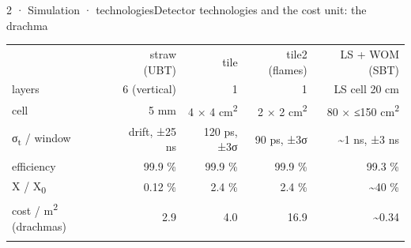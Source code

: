 \begin{btframe}{2 · Simulation · technologies}{Detector technologies and the cost unit: the drachma}
{\fontsize{6.36pt}{8.66pt}\selectfont\setlength{\tabcolsep}{3.05pt}\renewcommand{\arraystretch}{1.42}
\begin{tabularx}{\linewidth}{>{\raggedright\arraybackslash}Xrrrr}
\textcolor{muted}{} & \textcolor{muted}{straw (UBT)} & \textcolor{muted}{tile} & \textcolor{muted}{tile2 (flames)} & \textcolor{muted}{LS + WOM (SBT)} \\\headrule
layers & 6 (vertical) & 1 & 1 & LS cell 20 cm \\\rowrule
cell & 5 mm & 4 × 4 cm\textsuperscript{2} & 2 × 2 cm\textsuperscript{2} & 80 × ≤150 cm\textsuperscript{2} \\\rowrule
σ\textsubscript{t} / window & drift, ±25 ns & 120 ps, ±3σ & 90 ps, ±3σ & \textasciitilde{}1 ns, ±3 ns \\\rowrule
efficiency & 99.9 \% & 99.9 \% & 99.9 \% & 99.3 \% \\\rowrule
X / X\textsubscript{0} & 0.12 \% & 2.4 \% & 2.4 \% & \textasciitilde{}40 \% \\\rowrule
cost / m\textsuperscript{2} (drachmas) & 2.9 & 4.0 & 16.9 & \textasciitilde{}0.34 \\\rowrule
\end{tabularx}\par}


\end{btframe}
